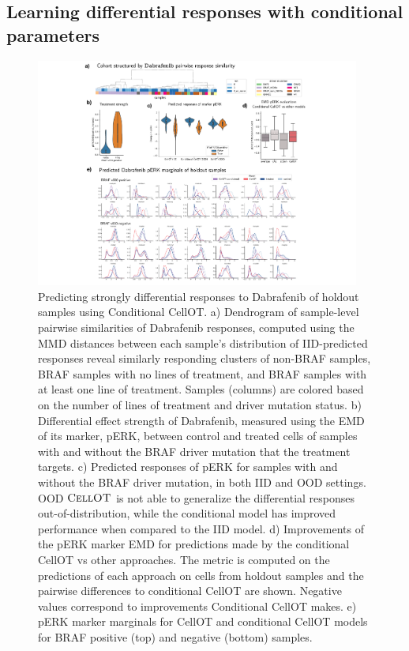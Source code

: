 \subsection{Learning differential responses with conditional parameters}

\begin{figure}[h]
  \begin{center}
    \includegraphics[width=0.95\textwidth]{figures/cellot-cohort/condot.pdf}
  \end{center}
  \caption{
    Predicting strongly differential responses to Dabrafenib of holdout samples using Conditional CellOT.
    a) Dendrogram of sample-level pairwise similarities of Dabrafenib responses, computed using the MMD distances between each sample's distribution of IID-predicted responses reveal similarly responding clusters of non-BRAF samples, BRAF samples with no lines of treatment, and BRAF samples with at least one line of treatment.
    Samples (columns) are colored based on the number of lines of treatment and driver mutation status.
    b) Differential effect strength of Dabrafenib, measured using the EMD of its marker, pERK, between control and treated cells of samples with and without the BRAF driver mutation that the treatment targets.
    c) Predicted responses of pERK for samples with and without the BRAF driver mutation, in both IID and OOD settings.
    OOD $\textsc{CellOT}$ is not able to generalize the differential responses out-of-distribution, while the conditional model has improved performance when compared to the IID model.
    d) Improvements of the pERK marker EMD for predictions made by the conditional CellOT vs other approaches. The metric is computed on the predictions of each approach on cells from holdout samples and the pairwise differences to conditional CellOT are shown. Negative values correspond to improvements Conditional CellOT makes. 
    e) pERK marker marginals for CellOT and conditional CellOT models for BRAF positive (top) and negative (bottom) samples.
  }\label{fig:conditional-ot}
\end{figure}

